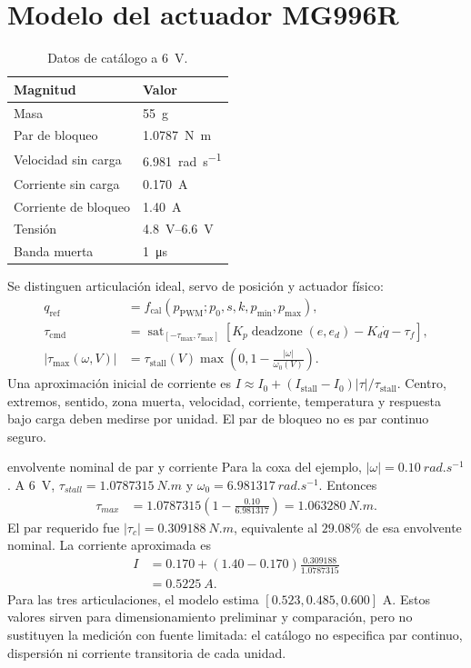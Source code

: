\documentclass[11pt,letterpaper]{article}
\newcommand{\sat}{\operatorname{sat}}
\begin{document}
\section{Modelo del actuador MG996R}
\begin{table}[ht]\centering\caption{Datos de catálogo a \SI{6}{V}.}
\begin{tabular}{ll}\toprule Magnitud&Valor\\\midrule
Masa&\SI{55}{g}\\Par de bloqueo&\SI{1.0787}{N.m}\\
Velocidad sin carga&\SI{6.981}{rad.s^{-1}}\\
Corriente sin carga&\SI{0.170}{A}\\Corriente de bloqueo&\SI{1.40}{A}\\
Tensión&\SIrange{4.8}{6.6}{V}\\Banda muerta&\SI{1}{\micro s}\\\bottomrule
\end{tabular}\end{table}
Se distinguen articulación ideal, servo de posición y actuador físico:
\begin{align}
 q_{\mathrm{ref}}&=f_{\mathrm{cal}}(p_{\mathrm{PWM}};p_0,s,k,p_{\min},p_{\max}),\\
 \tau_{\mathrm{cmd}}&=\sat_{[-\tau_{\max},\tau_{\max}]}
 [K_p\operatorname{deadzone}(e,e_d)-K_d\dot q-\tau_f],\\
 |\tau_{\max}(\omega,V)|&=\tau_{\mathrm{stall}}(V)
 \max\!\left(0,1-\frac{|\omega|}{\omega_0(V)}\right).\label{eq:actuator}
\end{align}
Una aproximación inicial de corriente es
$I\approx I_0+(I_{\mathrm{stall}}-I_0)|\tau|/\tau_{\mathrm{stall}}$.
Centro, extremos, sentido, zona muerta, velocidad, corriente, temperatura y
respuesta bajo carga deben medirse por unidad. El par de bloqueo no es par
continuo seguro.

\begin{workedexample}{envolvente nominal de par y corriente}
Para la coxa del ejemplo, $|\omega|=\SI{0.10}{rad.s^{-1}}$. A \SI{6}{V},
$\tau_{stall}=\SI{1.0787315}{N.m}$ y
$\omega_0=\SI{6.981317}{rad.s^{-1}}$. Entonces
\begin{align*}
 \tau_{max}&=1.0787315\left(1-\frac{0.10}{6.981317}\right)
 =\SI{1.063280}{N.m}.
\end{align*}
El par requerido fue $|\tau_c|=\SI{0.309188}{N.m}$, equivalente al
$29.08\%$ de esa envolvente nominal. La corriente aproximada es
\begin{align*}
 I&=0.170+(1.40-0.170)\frac{0.309188}{1.0787315}\\
  &=\boxed{\SI{0.5225}{A}}.
\end{align*}
Para las tres articulaciones, el modelo estima
$[0.523,0.485,0.600]$ A. Estos valores sirven para dimensionamiento preliminar
y comparación, pero no sustituyen la medición con fuente limitada: el catálogo
no especifica par continuo, dispersión ni corriente transitoria de cada unidad.
\end{workedexample}
\end{document}
